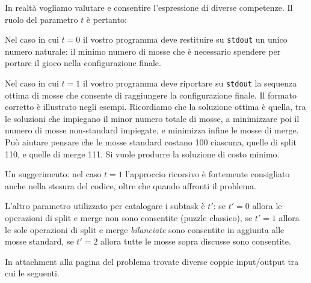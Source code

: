 In realtà vogliamo valutare e consentire l'espressione di diverse competenze. Il ruolo del parametro $t$ è pertanto:

\indent
Nel caso in cui $t=0$ il vostro programma deve restituire su \verb'stdout' un unico numero naturale: il minimo numero di mosse che è necessario spendere per portare il gioco nella configurazione finale.

\indent
Nel caso in cui $t= 1$ il vostro programma deve riportare su \verb'stdout' la sequenza ottima di mosse che consente di raggiungere la configurazione finale. Il formato corretto è illustrato negli esempi. Ricordiamo che la soluzione ottima è quella, tra le soluzioni che impiegano il minor numero totale di mosse, a minimizzare poi il numero di mosse non-standard impiegate, e minimizza infine le mosse di merge. Può aiutare pensare che le mosse standard costano 100 ciascuna, quelle di split 110, e quelle di merge 111. Si vuole produrre la soluzione di costo minimo.

Un suggerimento: nel caso $t=1$ l'approccio ricorsivo è fortemente consigliato anche nella stesura del codice, oltre che quando affronti il problema.

L'altro parametro utilizzato per catalogare i subtask è $t'$: se $t'=0$ allora le operazioni di split e merge non sono consentite (puzzle classico), se $t'=1$ allora le sole operazioni di split e merge {\it bilanciate} sono consentite in aggiunta alle mosse standard, se $t'=2$ allora tutte le mosse sopra discusse sono consentite.



In attachment alla pagina del problema trovate diverse coppie input/output tra cui le seguenti.

\vspace{0.5cm}

\vspace{0.5cm}

\vspace{0.5cm}

